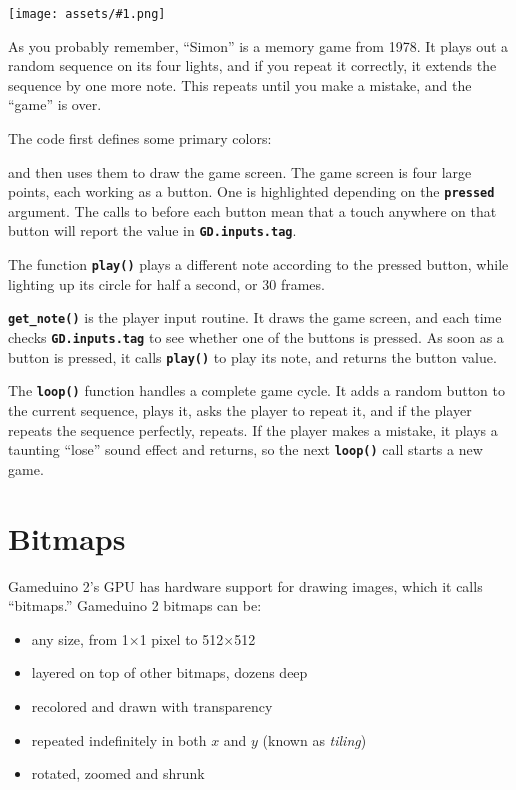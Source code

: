 \documentclass[10pt]{book}
\makeatletter
\newcommand{\png}[1]{
\begin{center}
\texttt{[image: assets/\#1.png]}
\end{center}
}
\newcommand{\mach}[1]{\texttt{\textbf{#1}}}
\newcommand{\cmdidx}[1]{
\index{#1@\mach{#1()}}
}
\newcommand{\dcmd}[1]{\cmdidx{#1}\nameref{#1}}
\newcommand{\term}[1]{\emph{#1}\index{#1}}
\makeatother
\begin{document}
\png{simon}

As you probably remember, ``Simon'' is a memory game from 1978.
It plays out a random sequence on its four lights, and if you repeat it correctly, it extends the sequence by one more note.
This repeats until you make a mistake, and the ``game'' is over.

The code first defines some primary colors:


\noindent
and then uses them to draw the game screen.
The game screen is four large points, each working as a button.
One is highlighted depending on the \mach{pressed} argument.
The calls to \dcmd{Tag} before each button mean that a touch anywhere
on that button will report the value in \mach{GD.inputs.tag}.

\newpage
{}

The function \mach{play()} plays a different note according to the pressed button,
while lighting up its circle for half a second, or 30 frames.


\mach{get\_note()} is the player input routine.
It draws the game screen, and each time checks
\mach{GD.inputs.tag} to see whether one of the buttons is pressed.
As soon as a button is pressed, it calls \mach{play()} to play its note, and returns the button value.


The \mach{loop()} function
handles a complete game cycle.
It adds a random button to the current sequence, plays it, asks the player to repeat it,
and if the player repeats the sequence perfectly, repeats.
If the player makes a mistake, it plays a taunting ``lose'' sound effect and returns, so the next
\mach{loop()} call starts a new game.


\chapter{Bitmaps}

Gameduino 2's GPU has hardware support for drawing images,
which it calls ``bitmaps.''
Gameduino 2 bitmaps can be:

\begin{itemize}
\item any size, from 1$\times$1 pixel to 512$\times$512
\item layered on top of other bitmaps, dozens deep
\item recolored and drawn with transparency
\item repeated indefinitely in both $x$ and $y$ (known as \term{tiling})
\item rotated, zoomed and shrunk
\end{itemize}
\end{document}
